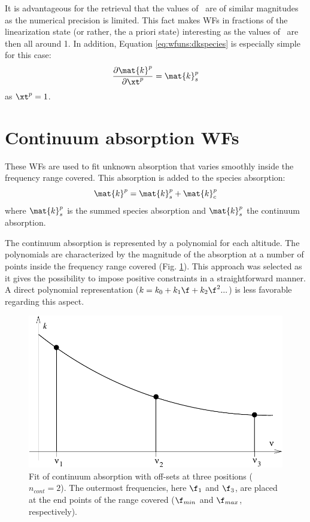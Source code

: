  It is advantageous for the retrieval that the values of \xt\ are of
 similar magnitudes \citep{schimpf:97,eriksson:99} as the numerical
 precision is limited. This fact makes WFs
 in fractions of the linearization state (or rather, the a priori
 state) interesting as the values of \xt\ are then all around 1. In 
 addition, Equation \ref{eq:wfuns:dkspecies} is especially simple
 for this case:
 \begin{equation}
   \frac{\partial \mat{k}^p}{\partial \xt^p} = \mat{k}^p_s
 \end{equation}
 as $\xt^p=1$.


\section{Continuum absorption WFs}
 \label{sec:wfuns:cont}

 These WFs are used to fit unknown absorption that varies smoothly inside
 the frequency range covered. This absorption
 is added to the species absorption:
 \begin{equation}
   \mat{k}^p = \mat{k}^p_s + \mat{k}^p_c
 \end{equation}
 where $\mat{k}^p_s$ is the summed species absorption and $\mat{k}^p_s$
 the continuum absorption.
 
 The continuum absorption is represented by a polynomial for each
 altitude. The polynomials are characterized by the magnitude of the
 absorption at a number of points inside the frequency range covered
 (Fig. \ref{fig:wfuns:cont}). This approach was selected as it gives
 the possibility to impose positive constraints in a straightforward
 manner. A direct polynomial representation ($k=k_0+k_1\f+k_2\f^2...$) 
 is less favorable regarding this aspect.
 
 \begin{figure}[t]
  \begin{center}
   \includegraphics*[width=0.95\hsize]{Figs/contfit}
   \caption{Fit of continuum absorption with off-sets at three 
            positions ($n_{cont}=2$). The outermost frequencies, here 
            $\f_1$ and $\f_3$, are placed at the end points of the 
            range covered ($\f_{min}$ and $\f_{max}$, respectively).}
   \label{fig:wfuns:cont}  
  \end{center}
 \end{figure}

